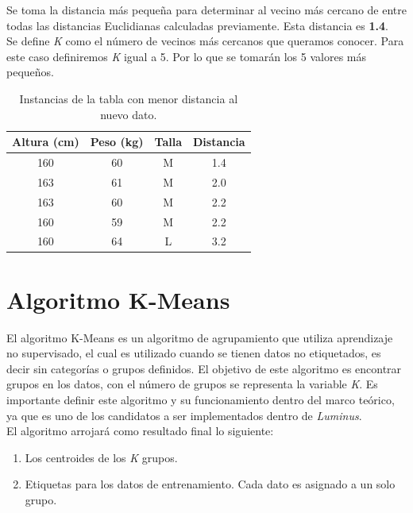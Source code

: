 \begin{UClist}
	\UCli Se toma la distancia más pequeña para determinar al vecino más cercano de entre todas las distancias Euclidianas calculadas previamente. Esta distancia es \textbf{1.4}.\\

	\UCli Se define \emph{K} como el número de vecinos más cercanos que queramos conocer. Para este caso definiremos \emph{K} igual a 5. Por lo que se tomarán los 5 valores más pequeños.\\

	\begin{table}[H]
		\begin{center}
			\label{tab:tablaKNNDistanciasMinimas}
			\begin{tabular}{c|c|c|c}
				\textbf{Altura (cm)} & \textbf{Peso (kg)} & \textbf{Talla} & \textbf{Distancia}\\
				\hline
				160 & 60 & M & 1.4\\
				163 & 61 & M & 2.0\\
				163 & 60 & M & 2.2\\
				160 & 59 & M & 2.2\\
				160 & 64 & L & 3.2\\
			\end{tabular}
		\end{center}
		\caption{Instancias de la tabla con menor distancia al nuevo dato.}
	\end{table}

\end{UClist}

\section{Algoritmo K-Means}
El algoritmo K-Means es un algoritmo de agrupamiento que utiliza aprendizaje no supervisado, el cual es utilizado cuando se tienen datos no etiquetados, es decir sin categorías o grupos definidos. El objetivo de este algoritmo es encontrar grupos en los datos, con el número de grupos se representa la variable \emph{K}\cite{KMeans}. Es importante definir este algoritmo y su funcionamiento dentro del marco teórico, ya que es uno de los candidatos a ser implementados dentro de \emph{Luminus}.\\

El algoritmo arrojará como resultado final lo siguiente:\\

\begin{enumerate}
	\item Los centroides de los \emph{K} grupos.\\
	\item Etiquetas para los datos de entrenamiento. Cada dato es asignado a un solo grupo.\\
\end{enumerate}

